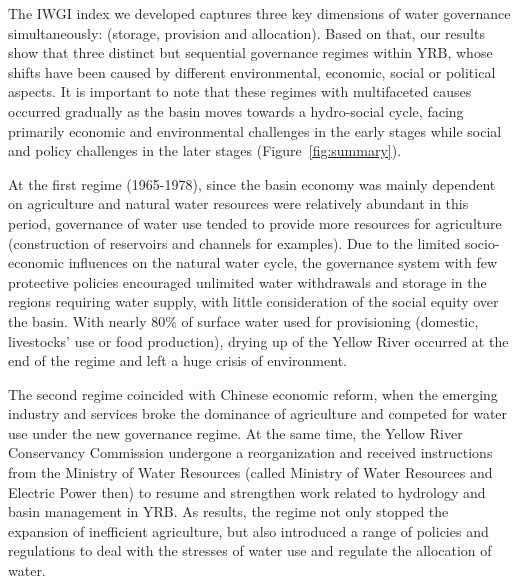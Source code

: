 \documentclass[9pt, twocolumn, twoside, lineno]{pnas-new}
\begin{document}
The IWGI index we developed captures three key dimensions of water governance simultaneously: (storage, provision and allocation). 
Based on that, our results show that three distinct but sequential governance regimes within YRB, whose shifts have been caused by different environmental, economic, social or political aspects.
It is important to note that these regimes with multifaceted causes occurred gradually as the basin moves towards a hydro-social cycle, facing primarily economic and environmental challenges in the early stages while social and policy challenges in the later stages (Figure~\ref{fig:summary}).

At the first regime (1965-1978), since the basin economy was mainly dependent on agriculture and natural water resources were relatively abundant in this period, governance of water use tended to provide more resources for agriculture (construction of reservoirs and channels for examples). 
Due to the limited socio-economic influences on the natural water cycle, the governance system with few protective policies encouraged unlimited water withdrawals and storage in the regions requiring water supply, with little consideration of the social equity over the basin. 
With nearly 80\% of surface water used for provisioning (domestic, livestocks' use or food production), drying up of the Yellow River occurred at the end of the regime and left a huge crisis of environment.

The second regime coincided with Chinese economic reform, when the emerging industry and services broke the dominance of agriculture and competed for water use under the new governance regime. 
At the same time, the Yellow River Conservancy Commission undergone a reorganization and received instructions from the Ministry of Water Resources (called Ministry of Water Resources and Electric Power then) to resume and strengthen work related to hydrology and basin management in YRB.
As results, the regime not only stopped the expansion of inefficient agriculture, but also introduced a range of policies and regulations to deal with the stresses of water use and regulate the allocation of water.
\end{document}
